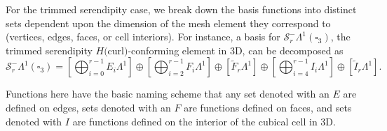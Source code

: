 \documentclass[format=acmsmall,screen,timestamp=false,a4paper]{acmart}
\newcommand\josh[1]{\textbf{\textcolor[rgb]{0,.5,1}{[Josh: #1]}}}
\newcommand{\calS}{\mathcal{S}}
\begin{document}
  
 For the trimmed serendipity case, we break down the basis functions into distinct sets dependent upon the dimension of the mesh element they correspond to (vertices, edges, faces, or cell interiors).  For instance, a basis for $\calS^-_r\Lambda^1(\square_3)$, the trimmed serendipity $H($curl$)$-conforming element in 3D, can be decomposed as
   \begin{equation}\label{eq:HCurlTrimmedSerendipityBasis}
   \calS^-_r\Lambda^1(\square_3) =    \left[\bigoplus_{i=0}^{r-1} E_i \Lambda^1\right]\oplus\left[ \bigoplus_{i=2}^{r-1}F_i \Lambda^1\right] \oplus \left[\tilde{F}_r \Lambda^1\right]\oplus\left[ \bigoplus_{i=4}^{r-1}I_i \Lambda^1 \right] \oplus \left[\tilde{I}_r \Lambda^1\right].
   \end{equation}
   
  \noindent Functions here have the basic naming scheme that any set denoted with an $E$ are defined on edges, sets denoted with an $F$ are functions defined on faces, and sets denoted with $I$ are functions defined on the interior of the cubical cell in 3D.
  
\end{document}
